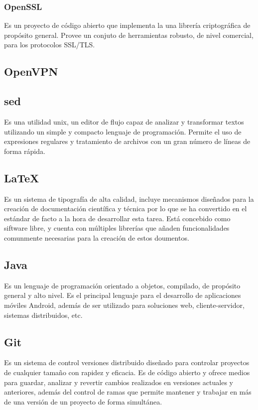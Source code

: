 \documentclass{article}
\begin{document}
        \subsubsection{OpenSSL}
            Es un proyecto de código abierto que implementa la una librería criptográfica de propósito general. Provee un conjuto de herramientas robusto, de nivel comercial, para los protocolos SSL/TLS.

    \subsection{OpenVPN}

    \subsection{sed}
        Es una utilidad unix, un editor de flujo capaz de analizar y transformar textos utilizando un simple y compacto lenguaje de programación. Permite el uso de expresiones regulares y tratamiento de archivos con un gran número de líneas de forma rápida.

    \subsection{\LaTeX}
        Es un sistema de tipografía de alta calidad, incluye mecanismos diseñados para la creación de documentación científica y técnica por lo que se ha convertido en el estándar de facto a la hora de desarrollar esta tarea. Está concebido como siftware libre, y cuenta con múltiples librerías que añaden funcionalidades comunmente necesarias para la creación de estos doumentos.

    \subsection{Java}
        Es un lenguaje de programación orientado a objetos, compilado, de propósito general y alto nivel. Es el principal lenguaje para el desarrollo de aplicaciones móviles Android, además de ser utilizado para soluciones web, cliente-servidor, sistemas distribuidos, etc.

    \subsection{Git}
        Es un sistema de control versiones distribuido diseñado para controlar proyectos de cualquier tamaño con rapidez y eficacia. Es de código abierto y ofrece medios para guardar, analizar y revertir cambios realizados en versiones actuales y anteriores, además del control de ramas que permite mantener y trabajar en más de una versión de un proyecto de forma simultánea.
\end{document}
